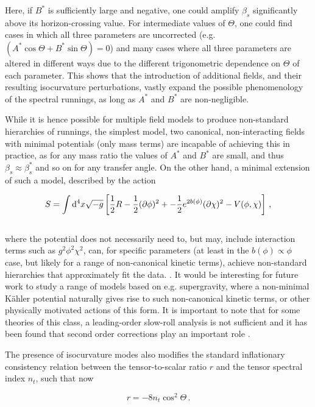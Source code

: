 \documentclass[universe,preprints,oneauthor,pdftex,10pt,a4paper]{mdpi}
\newcommand{\beq}{\begin{equation}}
\newcommand{\eeq}{\end{equation}\\}
\newcommand{\rpar}[1]{\left(#1\right)}
\newcommand{\spar}[1]{\left[#1\right]}
\newcommand{\bd}{{\rm d}}
\begin{document}
Here, if $B^*$ is sufficiently large and negative, one could amplify $\beta_s$ significantly above its horizon-crossing value. For intermediate values of $\Theta$, one could find cases in which  all three parameters are uncorrected (e.g. $ \rpar{A^* \cos \Theta + B^* \sin \Theta} = 0$) and many cases where all three parameters are altered in different ways due to the different trigonometric dependence on $\Theta$ of each parameter. This shows that the introduction of additional fields, and their resulting isocurvature perturbations, vastly expand the possible phenomenology of the spectral runnings, as long as $A^*$ and $B^*$ are non-negligible.

While it is hence possible for multiple field models to produce non-standard hierarchies of runnings, the simplest model, two canonical, non-interacting fields with minimal potentials (only mass terms) are incapable of achieving this in practice, as for any mass ratio the values of $A^*$ and $B^*$ are small, and thus $\beta_s \approx \beta_s^*$ and so on for any transfer angle. On the other hand, a minimal extension of such a model, described by the action \cite{DiMarco:2002eb,DiMarco:2005nq,Kaiser:2013sna,Schutz:2013fua}

\beq
S = \int \bd^4 x \sqrt{-g} \spar{\frac{1}{2} R - \frac{1}{2} (\partial \phi)^2 + - \frac{1}{2} e^{2 b(\phi)} (\partial \chi)^2 - V(\phi,\chi)} \, ,
\eeq

where the potential does not necessarily need to, but may, include interaction terms such as $g^2 \phi^2 \chi^2$, can, for specific parameters (at least in the $b(\phi) \propto \phi$ case, but likely for a range of non-canonical kinetic terms), achieve non-standard hierarchies that approximately fit the data. \cite{vandeBruck:2016rfv}. It would be interesting for future work to study a range of models based on e.g. supergravity, where a non-minimal K{\"a}hler potential naturally gives rise to such non-canonical kinetic terms, or other physically motivated actions of this form. It is important to note that for some theories of this class, a leading-order slow-roll analysis is not sufficient and it has been found that second order corrections play an important role \cite{vandeBruck:2014ata}.

The presence of isocurvature modes also modifies the standard inflationary consistency relation between the tensor-to-scalar ratio $r$ and the tensor spectral index $n_t$, such that now

\beq
r = - 8 n_t \cos^2 \Theta \, .
\eeq
\end{document}
